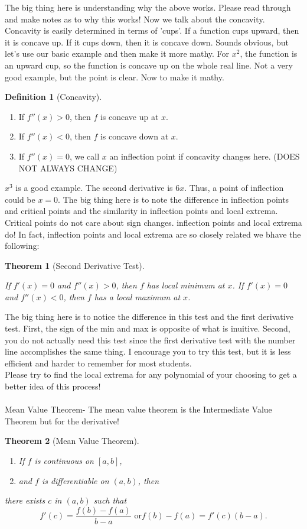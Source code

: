\documentclass[10pt]{article}
\theoremstyle{Theorem}
\newtheorem{theorem}{Theorem}[section]
\theoremstyle{definition}
\newtheorem{definition}{Definition}[section]
\theoremstyle{remark}
\theoremstyle{custom}
\begin{document}
The big thing here is understanding why the above works. Please read through and make notes as to why this works! Now we talk about the concavity. Concavity is easily determined in terms of 'cups'. If a function cups upward, then it is concave up. If it cups down, then it is concave down. Sounds obvious, but let's use our basic example and then make it more mathy. For $x^2$, the function is an upward cup, so the function is concave up on the whole real line. Not a very good example, but the point is clear. Now to make it mathy.
\begin{definition}[Concavity]
\begin{enumerate}[1.]
\item If $f''(x)>0$, then $f$ is concave up at $x$.
\item If $f''(x)<0$, then $f$ is concave down at $x$.
\item If $f''(x)=0$, we call $x$ an inflection point if concavity changes here. (DOES NOT ALWAYS CHANGE)
\end{enumerate}
\end{definition}
$x^3$ is a good example. The second derivative is $6x$. Thus, a point of inflection could be $x=0$. The big thing here is to note the difference in inflection points and critical points and the similarity in inflection points and local extrema. Critical points do not care about sign changes. inflection points and local extrema do! In fact, inflection points and local extrema are so closely related we bhave the following:
\begin{theorem}[Second Derivative Test]
\begin{enumerate}
If $f'(x)=0$ and $f''(x)>0$, then $f$ has local minimum at $x$.
If $f'(x)=0$ and $f''(x)<0$, then $f$ has a local maximum at $x$.
\end{enumerate}
\end{theorem}
The big thing here is to notice the difference in this test and the first derivative test. First, the sign of the min and max is opposite of what is inuitive. Second, you do not actually need this test since the first derivative test with the number line accomplishes the same thing. I encourage you to try this test, but it is less efficient and harder to remember for most students.\\
Please try to find the local extrema for any polynomial of your choosing to get a better idea of this process!\\\\
Mean Value Theorem- The mean value theorem is the   Intermediate Value Theorem but for the derivative! \begin{theorem}[Mean Value Theorem]
\begin{enumerate}[1.]
\item If $f$ is continuous on $[a,b]$,
\item and $f$ is differentiable on $(a,b)$, then
\end{enumerate}
there exists $c$ in $(a,b)$ such that 
\[
f'(c)=\dfrac{f(b)-f(a)}{b-a} \text{ or} f(b)-f(a)=f'(c)(b-a).
\]
\end{theorem}
\end{document}
